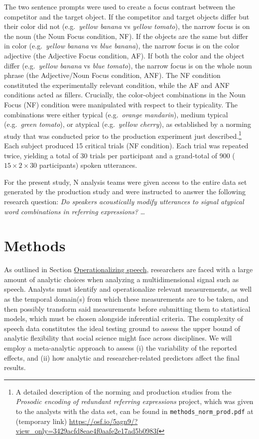 \documentclass[Review,times,sageh]{sagej}
\begin{document}
The two sentence prompts were used to create a focus contrast between the competitor and the target object.
If the competitor and target objects differ but their color did not (e.g.~\emph{yellow banana} vs \emph{yellow tomato}), the narrow focus is on the noun (the Noun Focus condition, NF).
If the objects are the same but differ in color (e.g.~\emph{yellow banana} vs \emph{blue banana}), the narrow focus is on the color adjective (the Adjective Focus condition, AF).
If both the color and the object differ (e.g.~\emph{yellow banana} vs \emph{blue tomato}), the narrow focus is on the whole noun phrase (the Adjective/Noun Focus condition, ANF).
The NF condition constituted the experimentally relevant condition, while the AF and ANF conditions acted as fillers.
Crucially, the color-object combinations in the Noun Focus (NF) condition were manipulated with respect to their typicality.
The combinations were either typical (e.g.~\emph{orange mandarin}), medium typical (e.g.~\emph{green tomato}), or atypical (e.g.~\emph{yellow cherry}), as established by a norming study that was conducted prior to the production experiment just described.\footnote{A detailed description of the norming and production studies from the \emph{Prosodic encoding of redundant referring expressions} project, which was given to the analysts with the data set, can be found in \texttt{methods\_norm\_prod.pdf} at (temporary link) \url{https://osf.io/5agn9/?view_only=3429acfd8eae4f0aafe2e17ad5b0983f}}
Each subject produced 15 critical trials (NF condition).
Each trial was repeated twice, yielding a total of 30 trials per participant and a grand-total of 900 (\(15 \times 2 \times 30\) participants) spoken utterances.

For the present study, N analysis teams were given access to the entire data set generated by the production study and were instructed to answer the following research question: \emph{Do speakers acoustically modify utterances to signal atypical word combinations in referring expressions?}
\ldots{}

\hypertarget{methods}{%
\section{Methods}\label{methods}}

As outlined in Section \protect\hyperlink{s:operspeech}{Operationalizing speech}, researchers are faced with a large amount of analytic choices when analyzing a multidimensional signal such as speech.
Analysts must identify and operationalize relevant measurements, as well as the temporal domain(s) from which these measurements are to be taken, and then possibly transform said measurements before submitting them to statistical models, which must be chosen alongside inferential criteria.
The complexity of speech data constitutes the ideal testing ground to assess the upper bound of analytic flexibility that social science might face across disciplines.
We will employ a meta-analytic approach to assess (i) the variability of the reported effects, and (ii) how analytic and researcher-related predictors affect the final results.
\end{document}
